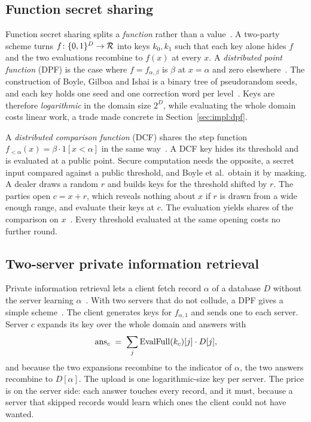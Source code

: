 \subsection{Function secret sharing}
\label{sec:background:fss}

Function secret sharing splits a \emph{function} rather than a
value~\cite{bgi2015,bgi2016}. A two-party scheme turns $f\colon \{0,1\}^{D} \to
\mathcal{R}$ into keys $k_0, k_1$ such that each key alone hides $f$ and the two
evaluations recombine to $f(x)$ at every $x$. A \emph{distributed point function}
(DPF) is the case where $f = f_{\alpha,\beta}$ is $\beta$ at $x = \alpha$ and zero
elsewhere~\cite{gilboa2014}. The construction of Boyle, Gilboa and Ishai is a
binary tree of pseudorandom seeds, and each key holds one seed and one correction
word per level~\cite{bgi2016}. Keys are therefore \emph{logarithmic} in the domain
size $2^{D}$, while evaluating the whole domain costs linear work, a trade made
concrete in Section~\ref{sec:impl:dpf}.

A \emph{distributed comparison function} (DCF) shares the step function
$f_{<\alpha}(x) = \beta \cdot 1[x < \alpha]$ in the same way~\cite{boyle2021}. A
DCF key hides its threshold and is evaluated at a public point. Secure
computation needs the opposite, a secret input compared against a public
threshold, and Boyle et al.\ obtain it by masking. A dealer draws a random $r$
and builds keys for the threshold shifted by $r$. The parties open $c = x + r$,
which reveals nothing about $x$ if $r$ is drawn from a wide enough range, and
evaluate their keys at $c$. The evaluation yields shares of the comparison on
$x$~\cite{boyle2021}. Every threshold evaluated at the same opening costs no
further round.

\subsection{Two-server private information retrieval}
\label{sec:background:pir}

Private information retrieval lets a client fetch record $\alpha$ of a database
$D$ without the server learning $\alpha$~\cite{chor1995}. With two servers that
do not collude, a DPF gives a simple scheme~\cite{bgi2015,hafiz2019}. The client
generates keys for $f_{\alpha,1}$ and sends one to each server. Server $c$
expands its key over the whole domain and answers with
%
\[
  \mathrm{ans}_c \;=\; \sum_{j} \operatorname{EvalFull}(k_c)[j] \cdot D[j],
\]
%
and because the two expansions recombine to the indicator of $\alpha$, the two
answers recombine to $D[\alpha]$. The upload is one logarithmic-size key per
server. The price is on the server side: each answer touches every record, and
it must, because a server that skipped records would learn which ones the client
could not have wanted.

